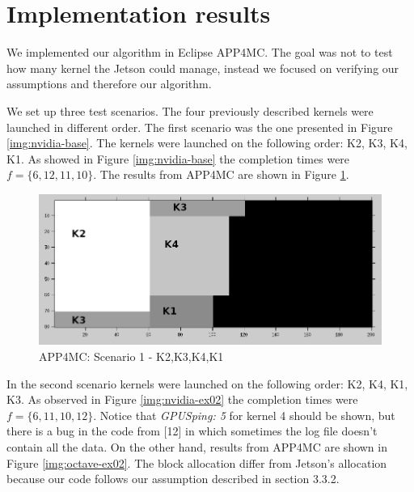 \documentclass[
  12pt,
  a4paperpaper,
]{report}
\begin{document}
\hypertarget{implementation-results}{%
\section{Implementation results}\label{implementation-results}}

We implemented our algorithm in Eclipse APP4MC. The goal was not to test
how many kernel the Jetson could manage, instead we focused on verifying
our assumptions and therefore our algorithm.

We set up three test scenarios. The four previously described kernels
were launched in different order. The first scenario was the one
presented in Figure \ref{img:nvidia-base}. The kernels were launched on
the following order: K2, K3, K4, K1. As showed in Figure
\ref{img:nvidia-base} the completion times were \(f = \{6, 12,11,10\}\).
The results from APP4MC are shown in Figure \ref{img:octave-base}.

\begin{figure}
\centering
\includegraphics[width=1\textwidth,height=\textheight]{source/figures/octave/base.png}
\caption{APP4MC: Scenario 1 - K2,K3,K4,K1 \label{img:octave-base}}
\end{figure}

In the second scenario kernels were launched on the following order: K2,
K4, K1, K3. As observed in Figure \ref{img:nvidia-ex02} the completion
times were \(f = \{6,11,10,12\}\). Notice that \emph{GPUSping: 5} for
kernel 4 should be shown, but there is a bug in the code from {[}12{]}
in which sometimes the log file doesn't contain all the data. On the
other hand, results from APP4MC are shown in Figure
\ref{img:octave-ex02}. The block allocation differ from Jetson's
allocation because our code follows our assumption described in section
3.3.2.
\end{document}
